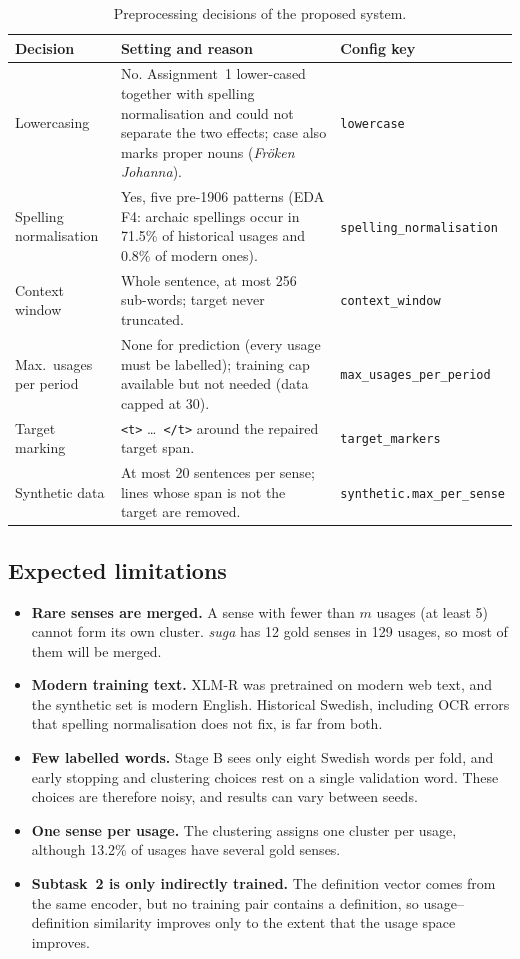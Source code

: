 \begin{table}[ht]
\centering
\small
\begin{tabularx}{\linewidth}{@{}lXl@{}}
\toprule
\textbf{Decision} & \textbf{Setting and reason} & \textbf{Config key}\\
\midrule
Lowercasing & No. Assignment~1 lower-cased together with spelling normalisation and could not separate the two effects; case also marks proper nouns (\textit{Fröken Johanna}). & \texttt{lowercase}\\
Spelling normalisation & Yes, five pre-1906 patterns (EDA F4: archaic spellings occur in 71.5\% of historical usages and 0.8\% of modern ones). & \texttt{spelling\_normalisation}\\
Context window & Whole sentence, at most 256 sub-words; target never truncated. & \texttt{context\_window}\\
Max.\ usages per period & None for prediction (every usage must be labelled); training cap available but not needed (data capped at 30). & \texttt{max\_usages\_per\_period}\\
Target marking & \texttt{<t>} \dots\ \texttt{</t>} around the repaired target span. & \texttt{target\_markers}\\
Synthetic data & At most 20 sentences per sense; lines whose span is not the target are removed. & \texttt{synthetic.max\_per\_sense}\\
\bottomrule
\end{tabularx}
\caption{Preprocessing decisions of the proposed system.}
\label{tab:preprocessing}
\end{table}

\subsection{Expected limitations}
\label{sec:approach-limitations}

\begin{itemize}
  \item \textbf{Rare senses are merged.} A sense with fewer than $m$ usages
        (at least 5) cannot form its own cluster. \textit{suga} has 12 gold senses
        in 129 usages, so most of them will be merged.
  \item \textbf{Modern training text.} XLM-R was pretrained on modern web text,
        and the synthetic set is modern English. Historical Swedish, including
        OCR errors that spelling normalisation does not fix, is far from both.
  \item \textbf{Few labelled words.} Stage B sees only eight Swedish words per
        fold, and early stopping and clustering choices rest on a single
        validation word. These choices are therefore noisy, and results can vary
        between seeds.
  \item \textbf{One sense per usage.} The clustering assigns one cluster per usage,
        although 13.2\% of usages have several gold senses.
  \item \textbf{Subtask~2 is only indirectly trained.} The definition vector comes
        from the same encoder, but no training pair contains a definition, so
        usage--definition similarity improves only to the extent that the
        usage space improves.
\end{itemize}
